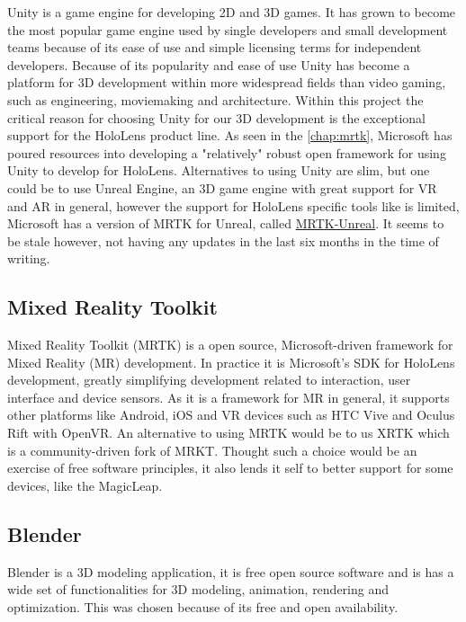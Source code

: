 Unity is a game engine for developing 2D and 3D games. It has grown to become the most popular game engine used by single developers and small development teams because of its ease of use and simple licensing terms for independent developers. Because of its popularity  and ease of use Unity has become a platform for 3D development within more widespread fields than video gaming, such as engineering, moviemaking and architecture. 
Within this project the critical reason for choosing Unity for our 3D development is the exceptional support for the HoloLens product line. As seen in the \autoref{chap:mrtk}, Microsoft has poured resources into developing a "relatively" robust open framework for using Unity to develop for HoloLens. 
Alternatives to using Unity are slim, but one could be to use Unreal Engine, an 3D game engine with great support for VR and AR in general, however the support for HoloLens specific tools like  is limited, Microsoft has a version of MRTK for Unreal, called \href{https://github.com/microsoft/MixedRealityToolkit-Unreal}{MRTK-Unreal}. It seems to be stale however, not having any updates in the last six months in the time of writing.

\subsection*{Mixed Reality Toolkit}\label{chap:mrtk}
Mixed Reality Toolkit (MRTK) is a open source, Microsoft-driven framework for Mixed Reality (MR) development. In practice it is Microsoft's SDK for HoloLens development, greatly simplifying development related to interaction, user interface and device sensors. As it is a framework for MR in general, it supports other platforms like Android, iOS and VR devices such as HTC Vive and Oculus Rift with OpenVR. 
An alternative to using MRTK would be to us XRTK which is a community-driven fork of MRKT. Thought such a choice would be an exercise of free software principles, it also lends it self to better support for some devices, like the MagicLeap.



\subsection*{Blender}\label{chap:blender}

Blender is a 3D modeling application, it is free open source software and is has a wide set of functionalities for 3D modeling, animation, rendering and optimization. This was chosen because of its free and open availability. 



